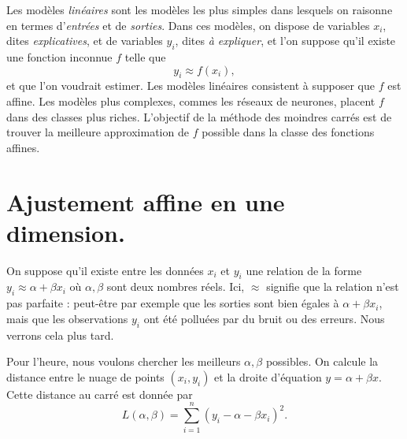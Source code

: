 \documentclass[
  10,
  letterpaper,
  DIV=11,
  numbers=noendperiod]{scrreport}
\theoremstyle{plain}
\theoremstyle{definition}
\theoremstyle{plain}
\theoremstyle{definition}
\theoremstyle{definition}
\theoremstyle{plain}
\theoremstyle{remark}
\begin{document}
Les modèles \emph{linéaires} sont les modèles les plus simples dans
lesquels on raisonne en termes d'\emph{entrées} et de \emph{sorties}.
Dans ces modèles, on dispose de variables \(x_i\), dites
\emph{explicatives}, et de variables \(y_i\), dites \emph{à expliquer},
et l'on suppose qu'il existe une fonction inconnue \(f\) telle que
\[y_i \approx f(x_i),\] et que l'on voudrait estimer. Les modèles
linéaires consistent à supposer que \(f\) est affine. Les modèles plus
complexes, commes les réseaux de neurones, placent \(f\) dans des
classes plus riches. L'objectif de la méthode des moindres carrés est de
trouver la meilleure approximation de \(f\) possible dans la classe des
fonctions affines.

\hypertarget{ajustement-affine-en-une-dimension.}{%
\section{Ajustement affine en une
dimension.}\label{ajustement-affine-en-une-dimension.}}

On suppose qu'il existe entre les données \(x_i\) et \(y_i\) une
relation de la forme \(y_i \approx \alpha + \beta x_i\) où
\(\alpha, \beta\) sont deux nombres réels. Ici, \(\approx\) signifie que
la relation n'est pas parfaite : peut-être par exemple que les sorties
sont bien égales à \(\alpha+\beta x_i\), mais que les observations
\(y_i\) ont été polluées par du bruit ou des erreurs. Nous verrons cela
plus tard.

Pour l'heure, nous voulons chercher les meilleurs \(\alpha, \beta\)
possibles. On calcule la distance entre le nuage de points
\((x_i, y_i)\) et la droite d'équation \(y = \alpha + \beta x\). Cette
distance au carré est donnée par
\[ L(\alpha, \beta) = \sum_{i=1}^n (y_i - \alpha - \beta x_i)^2.\]
\end{document}
